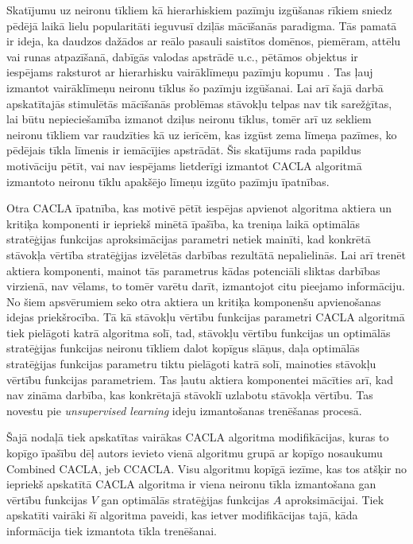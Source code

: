 \documentclass{ludis} %
\begin{document}
Skatījumu uz neironu tīkliem kā hierarhiskiem pazīmju izgūšanas rīkiem sniedz
pēdējā laikā lielu popularitāti ieguvusī dziļās mācīšanās paradigma. Tās pamatā
ir ideja, ka daudzos dažādos ar reālo pasauli saistītos domēnos, piemēram, attēlu
vai runas atpazīšanā, dabīgās valodas apstrādē u.c., pētāmos objektus ir
iespējams raksturot ar hierarhisku vairāklīmeņu pazīmju kopumu \autocite{Lecun2015}. Tas ļauj
izmantot vairāklīmeņu neironu tīklus šo pazīmju izgūšanai. %
Lai arī šajā darbā apskatītajās stimulētās mācīšanās problēmas stāvokļu telpas
nav tik sarežģītas, lai būtu nepieciešamība izmanot dziļus neironu tīklus, tomēr
arī uz sekliem neironu tīkliem var raudzīties kā uz ierīcēm, kas izgūst zema
līmeņa pazīmes, ko pēdējais tīkla līmenis ir iemācījies apstrādāt. Šis skatījums
rada papildus motivāciju pētīt, vai nav iespējams lietderīgi izmantot CACLA
algoritmā izmantoto neironu tīklu apakšējo līmeņu izgūto pazīmju īpatnības.

Otra CACLA īpatnība, kas motivē pētīt iespējas apvienot algoritma aktiera un
kritiķa komponenti ir iepriekš minētā īpašība, ka treniņa laikā optimālās
stratēģijas funkcijas aproksimācijas parametri netiek mainīti, kad konkrētā
stāvokļa vērtība stratēģijas izvēlētās darbības rezultātā nepalielinās. Lai arī
trenēt aktiera komponenti, mainot tās parametrus kādas potenciāli sliktas
darbības virzienā, nav vēlams, to tomēr varētu darīt, izmantojot citu
pieejamo informāciju. No šiem apsvērumiem seko otra aktiera un kritiķa
komponenšu apvienošanas idejas priekšrocība. Tā kā stāvokļu vērtību funkcijas
parametri CACLA algoritmā tiek pielāgoti katrā algoritma solī, tad, stāvokļu
vērtību funkcijas un optimālās stratēģijas funkcijas neironu tīkliem dalot
kopīgus slāņus, daļa optimālās stratēģijas funkcijas parametru tiktu pielāgoti
katrā solī, mainoties stāvokļu vērtību funkcijas parametriem. Tas ļautu aktiera
komponentei mācīties arī, kad nav zināma darbība, kas konkrētajā stāvoklī
uzlabotu stāvokļa vērtību. Tas novestu pie \textit{unsupervised learning} ideju
izmantošanas trenēšanas procesā. %

Šajā nodaļā tiek apskatītas vairākas CACLA algoritma modifikācijas, kuras to
kopīgo īpašību dēļ autors ievieto vienā algoritmu grupā ar kopīgo nosaukumu
Combined CACLA, jeb CCACLA. Visu algoritmu kopīgā iezīme, kas tos atšķir no
iepriekš apskatītā CACLA algoritma ir viena neironu tīkla izmantošana gan
vērtību funkcijas $V$ gan optimālās stratēģijas funkcijas $A$ aproksimācijai.
Tiek apskatīti vairāki šī algoritma paveidi, kas ietver modifikācijas tajā, kāda
informācija tiek izmantota tīkla trenēšanai.
\end{document}
